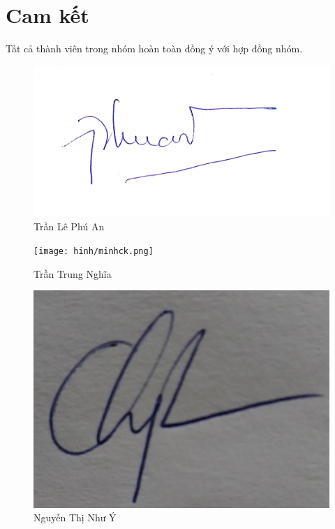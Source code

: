 \documentclass[../main-report.tex]{subfiles}
\begin{document}
\section{Cam kết}
Tất cả thành viên trong nhóm hoàn toàn đồng ý với hợp đồng nhóm.
\begin{figure}[ht]
    \centering
    \includegraphics[scale=0.1]{chapters/hinh/PhuAn.jpg}
    \caption{Trần Lê Phú An}
\end{figure}
\begin{figure}[ht]
    \centering
    \texttt{[image: hinh/minhck.png]}
    \caption{Trần Trung Nghĩa}
\end{figure}
\begin{figure}[ht]
    \centering
    \includegraphics[scale=0.1]{chapters/hinh/NhuY.jpg}
    \caption{Nguyễn Thị Như Ý}
\end{figure}
\end{document}
